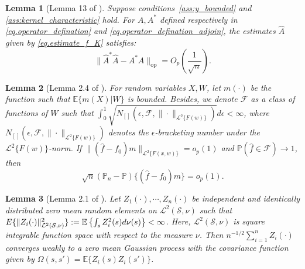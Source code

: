 \documentclass[
  12pt]{article}
\newtheorem{lemma}{Lemma}
\def\to{\rightarrow}
\def\wh{\widehat}
\def\mE{\mathbb{E}}
\def\cL{\mathcal{L}}
\def\cS{\mathcal{S}}
\def\mE{\mathbb{E}}
\begin{document}
\begin{lemma}[Lemma 13 of \cite{mastouri2021proximal}]\label{Lem: rates for Khat g - fhat}
Suppose conditions~\ref{ass:y_bounded} and \ref{ass:kernel_characteristic} hold. For $A, A^*$ defined respectively in \eqref{eq.operator_defination} and \eqref{eq.operator_defination_adjoin}, the estimates $\wh{A}$ given by \eqref{eq.estimate_f_K} satisfies:
$$
\|\widehat{A}^*\widehat{A} - A^*A\|_{\mathrm{op}} =O_p\left(\frac{1}{\sqrt{n}}\right).
$$ 
\end{lemma}

\begin{lemma}[Lemma 2.4 of \cite{beyhum2024testing}]\label{lemma:empirical process}
    For random variables $X, W$, let $m(\cdot)$ be the function such that $\mathbb{E}\{m(X)|W\}$ is bounded. Besides, we denote $\mathcal{F}$ as a class of functions of $W$ such that $\int_{0}^{1}\sqrt{N_{[ ]}(\epsilon,\mathcal{F},\|\cdot\|_{\cL^2\{F(w)\}})} d \epsilon < \infty $, where $N_{[ ]}(\epsilon,\mathcal{F},\|\cdot\|_{\cL^2\{F(w)\}})$ denotes the $\epsilon$-bracketing number under the $\cL^2\{F(w)\}$-norm. If $\|(\widehat{f}-f_{0})m\|_{\cL^2\{F(x,w)\}} = o_{p}(1)$ and $\mathbb{P}(\widehat{f}\in\mathcal{F})\to1$, then
    $$
    \sqrt{n} (\mathbb{P}_{n}-\mathbb{P}) \{(\widehat{f}-f_{0})m\}=o_{p}(1).
    $$
\end{lemma}

\begin{lemma}[Lemma 2.1 of \cite{li2003consistent}]\label{ central limit theorem}
    Let $Z_1(\cdot),\cdots, Z_n(\cdot)$ be independent and identically distributed zero mean random elements on $\mathcal{L}^{2}(\cS,\nu)$ such that $\mathbb \mE\{\|Z_{i}(\cdot)\|_{\mathcal{L}^{2}(\cS,\nu)}^{2}\} := \mE\left\{\int_s Z^2_i(s)  d\nu(s) \right\}<\infty$. Here, $\mathcal{L}^{2}(\cS,\nu)$ is square integrable function space with respect to the measure $\nu$. Then $n^{-1/2}\sum_{i=1}^nZ_i(\cdot)$ converges weakly to a zero mean Gaussian process with the covariance function given by $\Omega(s,s')=\mathbb E\{Z_i(s)Z_i(s')\}$.
\end{lemma}
\end{document}
